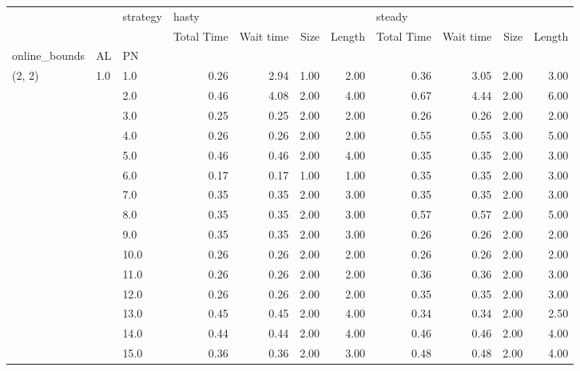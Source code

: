 \begin{tabular}{lllrrrrrrrr}
\toprule
       &     & strategy & \multicolumn{4}{l}{hasty} & \multicolumn{4}{l}{steady} \\
       &     & {} & Total Time & Wait time & Size & Length & Total Time & Wait time & Size & Length \\
online\_bounds & AL & PN &            &           &      &        &            &           &      &        \\
\midrule
(2, 2) & 1.0 & 1.0  &       0.26 &      2.94 & 1.00 &   2.00 &       0.36 &      3.05 & 2.00 &   3.00 \\
       &     & 2.0  &       0.46 &      4.08 & 2.00 &   4.00 &       0.67 &      4.44 & 2.00 &   6.00 \\
       &     & 3.0  &       0.25 &      0.25 & 2.00 &   2.00 &       0.26 &      0.26 & 2.00 &   2.00 \\
       &     & 4.0  &       0.26 &      0.26 & 2.00 &   2.00 &       0.55 &      0.55 & 3.00 &   5.00 \\
       &     & 5.0  &       0.46 &      0.46 & 2.00 &   4.00 &       0.35 &      0.35 & 2.00 &   3.00 \\
       &     & 6.0  &       0.17 &      0.17 & 1.00 &   1.00 &       0.35 &      0.35 & 2.00 &   3.00 \\
       &     & 7.0  &       0.35 &      0.35 & 2.00 &   3.00 &       0.35 &      0.35 & 2.00 &   3.00 \\
       &     & 8.0  &       0.35 &      0.35 & 2.00 &   3.00 &       0.57 &      0.57 & 2.00 &   5.00 \\
       &     & 9.0  &       0.35 &      0.35 & 2.00 &   3.00 &       0.26 &      0.26 & 2.00 &   2.00 \\
       &     & 10.0 &       0.26 &      0.26 & 2.00 &   2.00 &       0.26 &      0.26 & 2.00 &   2.00 \\
       &     & 11.0 &       0.26 &      0.26 & 2.00 &   2.00 &       0.36 &      0.36 & 2.00 &   3.00 \\
       &     & 12.0 &       0.26 &      0.26 & 2.00 &   2.00 &       0.35 &      0.35 & 2.00 &   3.00 \\
       &     & 13.0 &       0.45 &      0.45 & 2.00 &   4.00 &       0.34 &      0.34 & 2.00 &   2.50 \\
       &     & 14.0 &       0.44 &      0.44 & 2.00 &   4.00 &       0.46 &      0.46 & 2.00 &   4.00 \\
       &     & 15.0 &       0.36 &      0.36 & 2.00 &   3.00 &       0.48 &      0.48 & 2.00 &   4.00 \\

\end{tabular}
